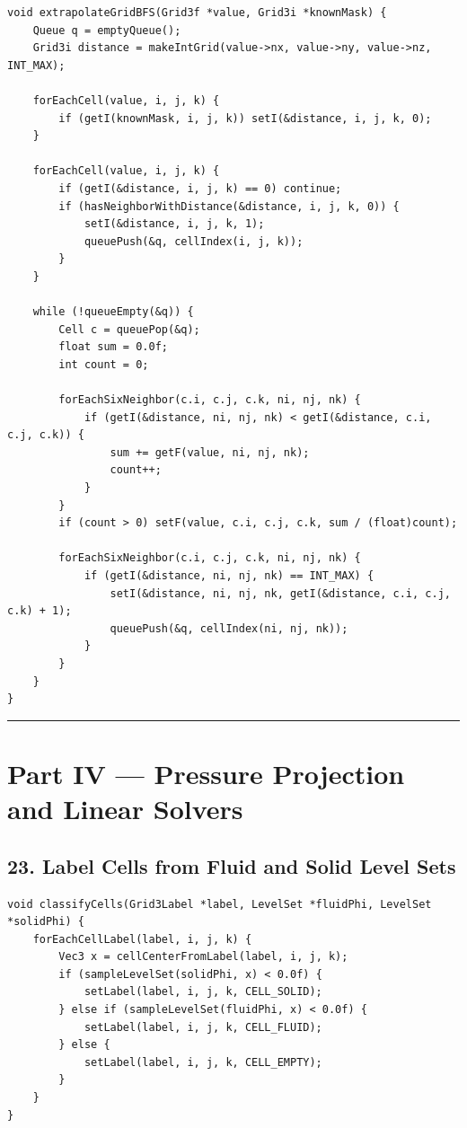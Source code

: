 \documentclass[10pt,letterpaper]{article}
\begin{document}
\begin{verbatim}
void extrapolateGridBFS(Grid3f *value, Grid3i *knownMask) {
    Queue q = emptyQueue();
    Grid3i distance = makeIntGrid(value->nx, value->ny, value->nz, INT_MAX);

    forEachCell(value, i, j, k) {
        if (getI(knownMask, i, j, k)) setI(&distance, i, j, k, 0);
    }

    forEachCell(value, i, j, k) {
        if (getI(&distance, i, j, k) == 0) continue;
        if (hasNeighborWithDistance(&distance, i, j, k, 0)) {
            setI(&distance, i, j, k, 1);
            queuePush(&q, cellIndex(i, j, k));
        }
    }

    while (!queueEmpty(&q)) {
        Cell c = queuePop(&q);
        float sum = 0.0f;
        int count = 0;

        forEachSixNeighbor(c.i, c.j, c.k, ni, nj, nk) {
            if (getI(&distance, ni, nj, nk) < getI(&distance, c.i, c.j, c.k)) {
                sum += getF(value, ni, nj, nk);
                count++;
            }
        }
        if (count > 0) setF(value, c.i, c.j, c.k, sum / (float)count);

        forEachSixNeighbor(c.i, c.j, c.k, ni, nj, nk) {
            if (getI(&distance, ni, nj, nk) == INT_MAX) {
                setI(&distance, ni, nj, nk, getI(&distance, c.i, c.j, c.k) + 1);
                queuePush(&q, cellIndex(ni, nj, nk));
            }
        }
    }
}
\end{verbatim}

\medskip\hrule\medskip

\clearpage
{}
\section*{Part IV --- Pressure Projection and Linear Solvers}

\subsection*{23. Label Cells from Fluid and Solid Level Sets}

\begin{verbatim}
void classifyCells(Grid3Label *label, LevelSet *fluidPhi, LevelSet *solidPhi) {
    forEachCellLabel(label, i, j, k) {
        Vec3 x = cellCenterFromLabel(label, i, j, k);
        if (sampleLevelSet(solidPhi, x) < 0.0f) {
            setLabel(label, i, j, k, CELL_SOLID);
        } else if (sampleLevelSet(fluidPhi, x) < 0.0f) {
            setLabel(label, i, j, k, CELL_FLUID);
        } else {
            setLabel(label, i, j, k, CELL_EMPTY);
        }
    }
}
\end{verbatim}
\end{document}

